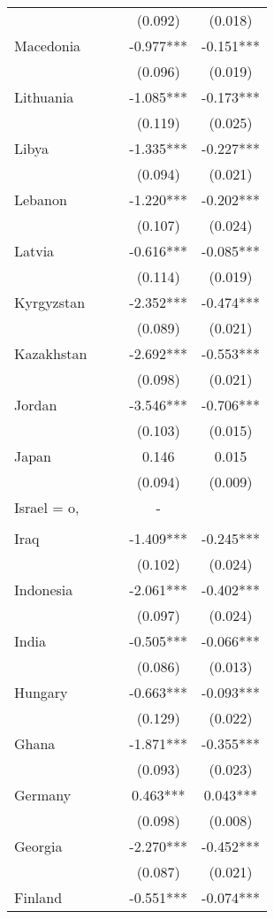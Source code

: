 \documentclass[]{article}
\begin{document}
\begin{tabular}{lcccc}
 &  &  & (0.092) & (0.018) \\
Macedonia &  &  & -0.977*** & -0.151*** \\
 &  &  & (0.096) & (0.019) \\
Lithuania &  &  & -1.085*** & -0.173*** \\
 &  &  & (0.119) & (0.025) \\
Libya &  &  & -1.335*** & -0.227*** \\
 &  &  & (0.094) & (0.021) \\
Lebanon &  &  & -1.220*** & -0.202*** \\
 &  &  & (0.107) & (0.024) \\
Latvia &  &  & -0.616*** & -0.085*** \\
 &  &  & (0.114) & (0.019) \\
Kyrgyzstan &  &  & -2.352*** & -0.474*** \\
 &  &  & (0.089) & (0.021) \\
Kazakhstan &  &  & -2.692*** & -0.553*** \\
 &  &  & (0.098) & (0.021) \\
Jordan &  &  & -3.546*** & -0.706*** \\
 &  &  & (0.103) & (0.015) \\
Japan &  &  & 0.146 & 0.015 \\
 &  &  & (0.094) & (0.009) \\
Israel = o, &  &  & - &  \\
 &  &  &  &  \\
Iraq &  &  & -1.409*** & -0.245*** \\
 &  &  & (0.102) & (0.024) \\
Indonesia &  &  & -2.061*** & -0.402*** \\
 &  &  & (0.097) & (0.024) \\
India &  &  & -0.505*** & -0.066*** \\
 &  &  & (0.086) & (0.013) \\
Hungary &  &  & -0.663*** & -0.093*** \\
 &  &  & (0.129) & (0.022) \\
Ghana &  &  & -1.871*** & -0.355*** \\
 &  &  & (0.093) & (0.023) \\
Germany &  &  & 0.463*** & 0.043*** \\
 &  &  & (0.098) & (0.008) \\
Georgia &  &  & -2.270*** & -0.452*** \\
 &  &  & (0.087) & (0.021) \\
Finland &  &  & -0.551*** & -0.074*** \\

\end{tabular}
\end{document}
